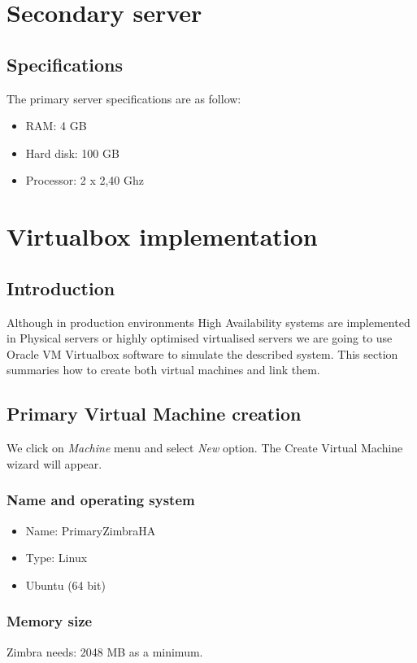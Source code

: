 \section {Secondary server}
\subsection {Specifications}
The primary server specifications are as follow:
\begin{itemize}
  \item RAM: 4 GB
  \item Hard disk: 100 GB
  \item Processor: 2 x 2,40 Ghz
\end{itemize}

\section {\label{sec:virtualbox-implementation}Virtualbox implementation}
\subsection {Introduction}
Although in production environments High Availability systems are implemented in Physical servers or highly optimised virtualised servers we are going to use Oracle VM Virtualbox software to simulate the described system. This section summaries how to create both virtual machines and link them.

\subsection {\label{subsec:primary-virtual-machine-creation}Primary Virtual Machine creation}
We click on \textit{Machine} menu and select \textit{New} option. The Create Virtual Machine wizard will appear.

\subsubsection {Name and operating system}
\begin{itemize}
  \item Name: PrimaryZimbraHA
  \item Type: Linux
  \item Ubuntu (64 bit)
\end{itemize}

\subsubsection {Memory size}
Zimbra needs: 2048 MB as a minimum.
